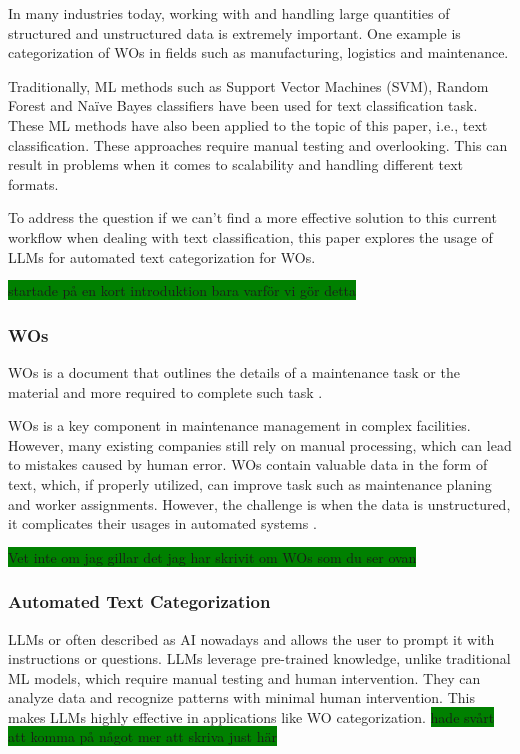 \documentclass{article}
\begin{document}
In many industries today, working with and handling large quantities of structured and unstructured data is extremely
important. One example is categorization of WOs in fields such as manufacturing, logistics and maintenance.

Traditionally, ML methods such as Support Vector Machines (SVM), Random Forest and Naïve Bayes classifiers
have been used for text classification task. These ML methods have also been applied to the topic of
this paper, i.e., text classification. These approaches require manual testing and overlooking. This can result in
problems when it comes to scalability and handling different text formats.

To address the question if we can't find a more effective solution to this current workflow
when dealing with text classification, this paper explores the usage of LLMs for automated
text categorization for WOs.

\colorbox{green}{startade på en kort introduktion bara varför vi gör detta}

\subsubsection{WOs}

WOs is a document that outlines the details of a maintenance task or the material and more required
to complete such task \cite{ibm2023}.

WOs is a key component in maintenance management in complex facilities. However, many existing companies
still rely on manual processing, which can lead to mistakes caused by human error. WOs contain valuable
data in the form of text, which, if properly utilized, can improve task such as maintenance planing and worker assignments.
However, the challenge is when the data is unstructured, it complicates their usages in automated systems \cite{li2023}.

\colorbox{green}{Vet inte om jag gillar det jag har skrivit om WOs som du ser ovan}

\subsubsection{Automated Text Categorization}

LLMs or often described as AI nowadays and allows the user to prompt it with instructions or questions.
LLMs leverage pre-trained knowledge, unlike traditional ML models, which require
manual testing and human intervention. They can analyze data and recognize patterns with minimal
human intervention. This makes LLMs highly effective in applications like WO categorization.
\colorbox{green}{hade svårt att komma på något mer att skriva just här}
\end{document}
